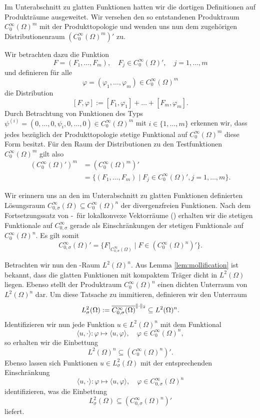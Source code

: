 Im Unterabschnitt zu glatten Funktionen hatten wir die dortigen Definitionen auf Produkträume ausgeweitet.
Wir versehen den so entstandenen Produktraum $C_0^\infty(\Omega)^m$ mit der Produkttopologie und wenden uns nun dem zugehörigen Distributionenraum $(C_0^\infty(\Omega)^m)'$ zu.

Wir betrachten dazu die Funktion
$$
  F = (F_1, \dots, F_m), \quad F_j \in C_0^\infty(\Omega)', \quad j = 1, \dots, m
$$
und definieren für alle 
$$\varphi = (\varphi_1, \dots, \varphi_m) \in C_0^\infty(\Omega)^m$$
die Distribution
\begin{equation}
  \label{eq:pairingVector}
  [F, \varphi] := [F_1, \varphi_1] + \dots + [F_m, \varphi_m].
\end{equation}
Durch Betrachtung von Funktionen des Typs $\psi^{(i)} = (0, \dots,0, \psi_i, 0,\dots,0) \in C_0^\infty(\Omega)^m$ mit $i \in \{1,\dots,m\}$ erkennen wir, dass jedes bezüglich der Produkttopologie stetige Funktional auf $C_0^\infty(\Omega)^m$ diese Form besitzt.
Für den Raum der Distributionen zu den Testfunktionen $C_0^\infty(\Omega)^m$ gilt also
\begin{align*}
  (C_0^\infty(\Omega)')^m 
  &= (C_0^\infty(\Omega)^m)' \\
  &= \{(F_1,\dots,F_m) \mid F_j \in C_0^\infty(\Omega)', j = 1, \dots,m\}.
\end{align*}

Wir erinnern uns an den im Unterabschnitt zu glatten Funktionen definierten Lösungsraum $C_{0, \sigma}^\infty(\Omega) \subseteq C_0^\infty(\Omega)^n$ der divergenzfreien Funktionen.
Nach dem Fortsetzungssatz von \hahn\hyp{}\banach\ für lokalkonvexe Vektorräume (\cite[S.408, Satz VIII.2.8]{werner2011fa}) erhalten wir die stetigen Funktionale auf $C_{0,\sigma}^\infty$ gerade als Einschränkungen der stetigen Funktionale auf $C_0^\infty(\Omega)^n$. 
Es gilt somit
$$
C_{0,\sigma}^\infty(\Omega)' = \{F|_{C_{0,\sigma}^\infty(\Omega)} \mid F \in (C_0^\infty(\Omega)^n)'\}.
$$

Betrachten wir nun den \hilbert\hyp{}Raum $L^2(\Omega)^n$.
Aus Lemma \ref{lem:mollification} ist bekannt, dass die glatten Funktionen mit kompaktem Träger dicht in $L^2(\Omega)$ liegen. 
Ebenso stellt der Produktraum $C_0^\infty(\Omega)^n$ einen dichten Unterraum von $L^2(\Omega)^n$ dar.
Um diese Tatsache zu immitieren, definieren wir den Unterraum 
$$
  L^2_\sigma(\Omega) 
  := \overline{C_{0,\sigma}^\infty(\Omega)}^{\lVert \cdot \rVert_2}
  \subseteq L^2(\Omega)^n.
$$
Identifizieren wir nun jede Funktion $u \in L^2(\Omega)^n$ mit dem Funktional
$$
\langle u, \cdot \rangle \colon \varphi \mapsto \langle u, \varphi \rangle, \quad \varphi \in C_0^\infty(\Omega)^n,
$$
so erhalten wir die Einbettung 
$$
  L^2(\Omega)^n \subseteq (C_0^\infty(\Omega)^n)'.
$$
Ebenso lassen sich Funktionen $u \in L^2_\sigma(\Omega)$ mit der entsprechenden Einschränkung
$$
\langle u, \cdot \rangle \colon \varphi \mapsto \langle u, \varphi \rangle, \quad \varphi \in C_{0,\sigma}^\infty(\Omega)^n
$$
identifizieren, was die Einbettung
$$
  L^2_\sigma(\Omega) \subseteq (C_{0,\sigma}^\infty(\Omega)^n)'
$$
liefert.


